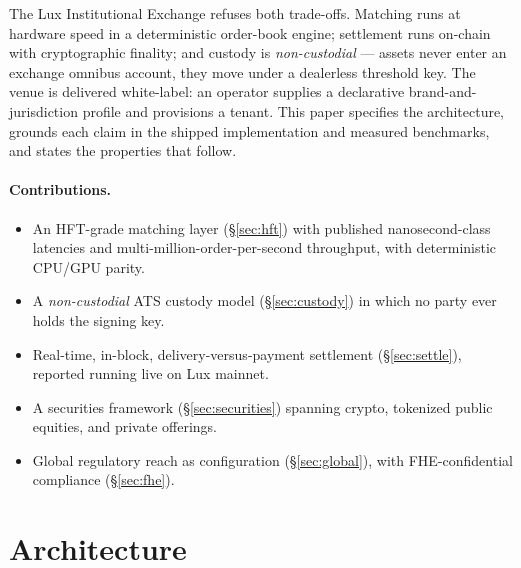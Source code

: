 \documentclass[11pt,a4paper]{article}
\begin{document}
The Lux Institutional Exchange refuses both trade-offs. Matching runs at
hardware speed in a deterministic order-book engine; settlement runs on-chain
with cryptographic finality; and custody is \emph{non-custodial} --- assets
never enter an exchange omnibus account, they move under a dealerless
threshold key. The venue is delivered white-label: an operator supplies a
declarative brand-and-jurisdiction profile and provisions a tenant. This
paper specifies the architecture, grounds each claim in the shipped
implementation and measured benchmarks, and states the properties that follow.

\paragraph{Contributions.}
\begin{itemize}[leftmargin=1.4em]
  \item An HFT-grade matching layer (\S\ref{sec:hft}) with published
        nanosecond-class latencies and multi-million-order-per-second
        throughput, with deterministic CPU/GPU parity.
  \item A \emph{non-custodial} ATS custody model (\S\ref{sec:custody}) in
        which no party ever holds the signing key.
  \item Real-time, in-block, delivery-versus-payment settlement
        (\S\ref{sec:settle}), reported running live on Lux mainnet.
  \item A securities framework (\S\ref{sec:securities}) spanning crypto,
        tokenized public equities, and private offerings.
  \item Global regulatory reach as configuration (\S\ref{sec:global}), with
        FHE-confidential compliance (\S\ref{sec:fhe}).
\end{itemize}

\section{Architecture}
\label{sec:arch}
\end{document}
